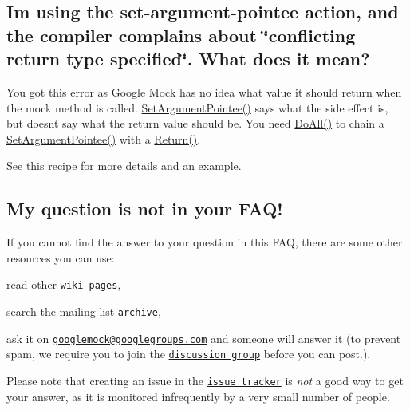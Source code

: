 \subsection*{I\textquotesingle{}m using the set-\/argument-\/pointee action, and the compiler complains about \char`\"{}conflicting return type specified\char`\"{}. What does it mean?}

You got this error as Google Mock has no idea what value it should return when the mock method is called. {\ttfamily \hyperlink{namespacetesting_a03b315d27c91a8e719f2b6c09964130b}{Set\+Argument\+Pointee()}} says what the side effect is, but doesn\textquotesingle{}t say what the return value should be. You need {\ttfamily \hyperlink{namespacetesting_a5f533932753d2af95000e96c4a3042e3}{Do\+All()}} to chain a {\ttfamily \hyperlink{namespacetesting_a03b315d27c91a8e719f2b6c09964130b}{Set\+Argument\+Pointee()}} with a {\ttfamily \hyperlink{namespacetesting_af6d1c13e9376c77671e37545cd84359c}{Return()}}.

See this recipe for more details and an example.

\subsection*{My question is not in your F\+A\+Q!}

If you cannot find the answer to your question in this F\+AQ, there are some other resources you can use\+:


\begin{DoxyEnumerate}
\item read other \href{http://code.google.com/p/googlemock/w/list}{\tt wiki pages},
\end{DoxyEnumerate}
\begin{DoxyEnumerate}
\item search the mailing list \href{http://groups.google.com/group/googlemock/topics}{\tt archive},
\end{DoxyEnumerate}
\begin{DoxyEnumerate}
\item ask it on \href{mailto:googlemock@googlegroups.com}{\tt googlemock@googlegroups.\+com} and someone will answer it (to prevent spam, we require you to join the \href{http://groups.google.com/group/googlemock}{\tt discussion group} before you can post.).
\end{DoxyEnumerate}

Please note that creating an issue in the \href{http://code.google.com/p/googlemock/issues/list}{\tt issue tracker} is {\itshape not} a good way to get your answer, as it is monitored infrequently by a very small number of people.

